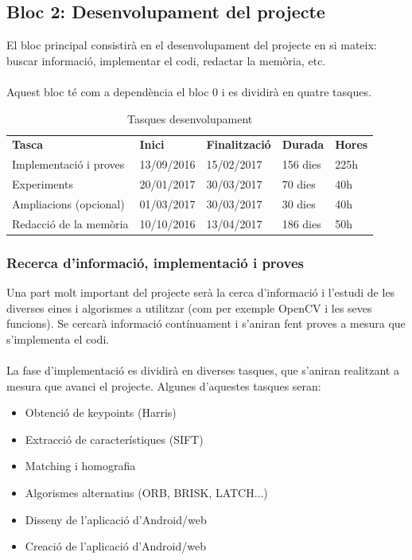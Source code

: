 	\subsection{Bloc 2: Desenvolupament del projecte}
			El bloc principal consistirà en el desenvolupament del projecte en si mateix: buscar informació, implementar el codi, redactar la memòria, etc.\\\\
			Aquest bloc té com a dependència el bloc 0 i es dividirà en quatre tasques.\\
			\begin{table}[H]
				\begin{center}
					\begin{tabular}{p{5cm} !{\vrule width -1pt}x{2.1cm} !{\vrule width -1pt}x{2.4cm} !{\vrule width -1pt}x{1.6cm} !{\vrule width -1pt}x{1.6cm}}
						\textbf{Tasca} & \textbf{Inici} & \textbf{Finalització} & \textbf{Durada} & \textbf{Hores} \\ %
						Implementació i proves & 13/09/2016 & 15/02/2017 & 156 dies & 225h \\
						Experiments & 20/01/2017 & 30/03/2017 & 70 dies & 40h \\
						Ampliacions (opcional) & 01/03/2017 & 30/03/2017 & 30 dies & 40h \\
						Redacció de la memòria & 10/10/2016 & 13/04/2017 & 186 dies & 50h \\
					\end{tabular}
				\end{center}
				\caption{Tasques desenvolupament}
			\end{table}

		\subsubsection{Recerca d'informació, implementació i proves}
			Una part molt important del projecte serà la cerca d'informació i l'estudi de les diverses eines i algorismes a utilitzar (com per exemple OpenCV i les seves funcions).
			Se cercarà informació contínuament i s'aniran fent proves a mesura que s'implementa el codi.\\\\
			La fase d'implementació es dividirà en diverses tasques, que s'aniran realitzant a mesura que avanci el projecte. Algunes d'aquestes tasques seran:\\
			\begin{itemize}
				\item{Obtenció de keypoints (Harris)}
				\item{Extracció de característiques (SIFT)}
				\item{Matching i homografia}
				\item{Algorismes alternatius (ORB\cite{Rublee:2011:OEA:2355573.2356268}, BRISK\cite{Leutenegger:2011:BBR:2355573.2356277}, LATCH...)}
				\item{Disseny de l'aplicació d'Android/web}
				\item{Creació de l'aplicació d'Android/web}
			\end{itemize}
